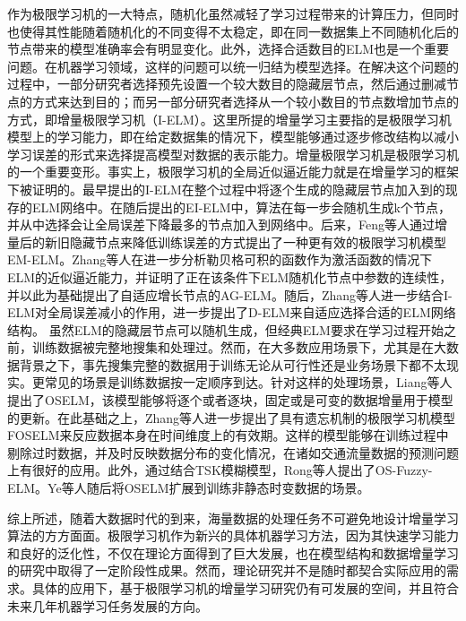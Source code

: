 作为极限学习机的一大特点，随机化虽然减轻了学习过程带来的计算压力，但同时也使得其性能随着随机化的不同变得不太稳定，即在同一数据集上不同随机化后的节点带来的模型准确率会有明显变化。此外，选择合适数目的ELM也是一个重要问题。在机器学习领域，这样的问题可以统一归结为模型选择。在解决这个问题的过程中，一部分研究者选择预先设置一个较大数目的隐藏层节点，然后通过删减节点的方式来达到目的；而另一部分研究者选择从一个较小数目的节点数增加节点的方式，即增量极限学习机（I-ELM）。这里所提的增量学习主要指的是极限学习机模型上的学习能力，即在给定数据集的情况下，模型能够通过逐步修改结构以减小学习误差的形式来选择提高模型对数据的表示能力。增量极限学习机是极限学习机的一个重要变形。事实上，极限学习机的全局近似逼近能力就是在增量学习的框架下被证明的。最早提出的I-ELM在整个过程中将逐个生成的隐藏层节点加入到的现存的ELM网络中。在随后提出的EI-ELM中，算法在每一步会随机生成k个节点，并从中选择会让全局误差下降最多的节点加入到网络中。后来，Feng等人通过增量后的新旧隐藏节点来降低训练误差的方式提出了一种更有效的极限学习机模型EM-ELM。Zhang等人在进一步分析勒贝格可积的函数作为激活函数的情况下ELM的近似逼近能力，并证明了正在该条件下ELM随机化节点中参数的连续性，并以此为基础提出了自适应增长节点的AG-ELM。随后，Zhang等人进一步结合I-ELM对全局误差减小的作用，进一步提出了D-ELM来自适应选择合适的ELM网络结构。
虽然ELM的隐藏层节点可以随机生成，但经典ELM要求在学习过程开始之前，训练数据被完整地搜集和处理过。然而，在大多数应用场景下，尤其是在大数据背景之下，事先搜集完整的数据用于训练无论从可行性还是业务场景下都不太现实。更常见的场景是训练数据按一定顺序到达。针对这样的处理场景，Liang等人提出了OSELM，该模型能够将逐个或者逐块，固定或是可变的数据增量用于模型的更新。在此基础之上，Zhang等人进一步提出了具有遗忘机制的极限学习机模型FOSELM来反应数据本身在时间维度上的有效期。这样的模型能够在训练过程中剔除过时数据，并及时反映数据分布的变化情况，在诸如交通流量数据的预测问题上有很好的应用。此外，通过结合TSK模糊模型，Rong等人提出了OS-Fuzzy-ELM。Ye等人随后将OSELM扩展到训练非静态时变数据的场景。

综上所述，随着大数据时代的到来，海量数据的处理任务不可避免地设计增量学习算法的方方面面。极限学习机作为新兴的具体机器学习方法，因为其快速学习能力和良好的泛化性，不仅在理论方面得到了巨大发展，也在模型结构和数据增量学习的研究中取得了一定阶段性成果。然而，理论研究并不是随时都契合实际应用的需求。具体的应用下，基于极限学习机的增量学习研究仍有可发展的空间，并且符合未来几年机器学习任务发展的方向。


